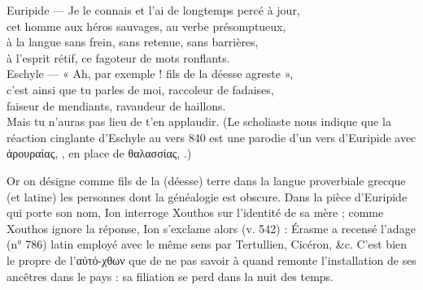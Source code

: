 {{Euripide --- Je le connais et l'ai de longtemps percé à jour,\\
cet homme aux héros sauvages, au verbe présomptueux,\\
à la langue sans frein, sans retenue, sans barrières,\\
à l'esprit rétif, ce fagoteur de mots ronflants.\\
Eschyle --- « Ah, par exemple ! fils de la déesse agreste », \\
c'est ainsi que tu parles de moi, raccoleur de fadaises,\\
faiseur de mendiants, ravaudeur de haillons.\\
Mais tu n'auras pas lieu de t'en applaudir.}
(Le scholiaste nous indique que la réaction cinglante d'Eschyle au vers 840 est une parodie d'un vers d'Euripide avec ἀρουραίας, , en place de θαλασσίας, .)



Or on désigne comme fils de la (déesse) terre dans la langue proverbiale grecque (et latine) les personnes dont la généalogie est obscure. 
Dans la pièce d'Euripide qui porte son nom, Ion interroge Xouthos sur l'identité de sa mère ; comme Xouthos ignore la réponse, Ion s'exclame alors (v. 542) :
Érasme a recensé l'adage (n° 786) latin  employé avec le même sens par Tertullien, Cicéron, \&c.
C'est bien le propre de l'αὐτό-χθων que de ne pas savoir à quand remonte l'installation de ses ancêtres dans le pays : sa filiation se perd dans la nuit des temps.

}
